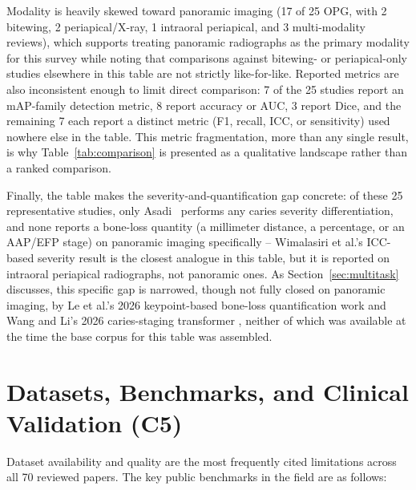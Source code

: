 \documentclass[conference]{IEEEtran}
\begin{document}
Modality is heavily skewed toward panoramic imaging (17 of 25 OPG,
with 2 bitewing, 2 periapical/X-ray, 1 intraoral periapical, and 3
multi-modality reviews), which supports treating panoramic radiographs
as the primary modality for this survey while noting that comparisons
against bitewing- or periapical-only studies elsewhere in this table
are not strictly like-for-like. Reported metrics are also
inconsistent enough to limit direct comparison: 7 of the 25 studies
report an mAP-family detection metric, 8 report accuracy or AUC, 3
report Dice, and the remaining 7 each report a distinct metric (F1,
recall, ICC, or sensitivity) used nowhere else in the table. This
metric fragmentation, more than any single result, is why
Table~\ref{tab:comparison} is presented as a qualitative landscape
rather than a ranked comparison.

Finally, the table makes the severity-and-quantification gap
concrete: of these 25 representative studies, only
Asadi~\cite{asadi2024detection} performs any caries severity
differentiation, and none reports a bone-loss quantity (a millimeter
distance, a percentage, or an AAP/EFP stage) on panoramic imaging
specifically -- Wimalasiri et al.'s ICC-based severity result
\cite{wimalasiri2025ai} is the closest analogue in this table, but it
is reported on intraoral periapical radiographs, not panoramic ones.
As Section~\ref{sec:multitask} discusses, this specific gap is
narrowed, though not fully closed on panoramic imaging, by Le et
al.'s 2026 keypoint-based bone-loss quantification work
\cite{le2026automated} and Wang and Li's 2026 caries-staging
transformer \cite{wang2026transformer}, neither of which was available
at the time the base corpus for this table was assembled.

\section{Datasets, Benchmarks, and Clinical Validation (C5)}
\label{sec:datasets}

Dataset availability and quality are the most frequently cited
limitations across all 70 reviewed papers. The key public
benchmarks in the field are as follows:
\end{document}
